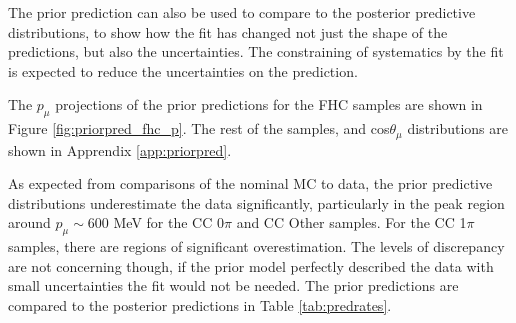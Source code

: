 The prior prediction can also be used to compare to the posterior predictive distributions, to show how the fit has changed not just the shape of the predictions, but also the uncertainties. The constraining of systematics by the fit is expected to reduce the uncertainties on the prediction.

The $p_{\mu}$ projections of the prior predictions for the FHC samples are shown in Figure \ref{fig:priorpred_fhc_p}. The rest of the samples, and cos$\theta_{\mu}$ distributions are shown in Apprendix \ref{app:priorpred}.

As expected from comparisons of the nominal MC to data, the prior predictive distributions underestimate the data significantly, particularly in the peak region around $p_{\mu} \sim$600 MeV for the CC 0$\pi$ and CC Other samples. For the CC 1$\pi$ samples, there are regions of significant overestimation. The levels of discrepancy are not concerning though, if the prior model perfectly described the data with small uncertainties the fit would not be needed. The prior predictions are compared to the posterior predictions in Table \ref{tab:predrates}.


